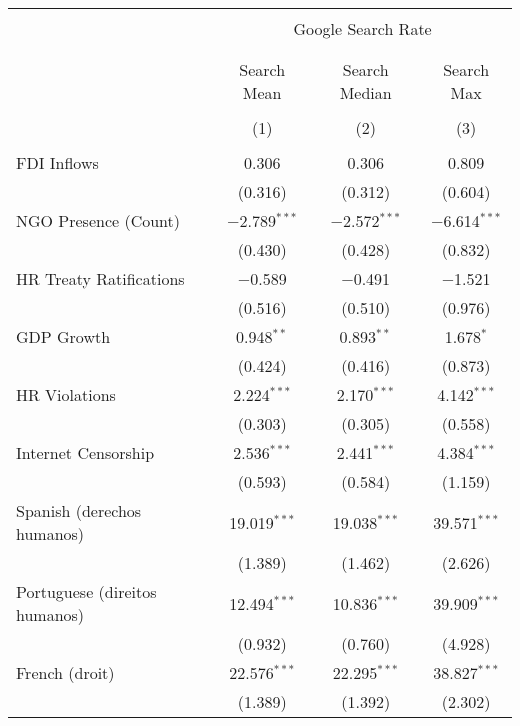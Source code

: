 
\begin{table}[!htbp] \centering 
  \caption{} 
  \label{} 
\begin{tabular}{@{\extracolsep{5pt}}lccc} 
\\[-1.8ex]\hline 
\hline \\[-1.8ex] 
 & \multicolumn{3}{c}{Google Search Rate} \\ 
\cline{2-4} 
\\[-1.8ex] & \multicolumn{3}{c}{ } \\ 
 & Search Mean & Search Median & Search Max \\ 
\\[-1.8ex] & (1) & (2) & (3)\\ 
\hline \\[-1.8ex] 
 FDI Inflows & 0.306 & 0.306 & 0.809 \\ 
  & (0.316) & (0.312) & (0.604) \\ 
  NGO Presence (Count) & $-$2.789$^{***}$ & $-$2.572$^{***}$ & $-$6.614$^{***}$ \\ 
  & (0.430) & (0.428) & (0.832) \\ 
  HR Treaty Ratifications & $-$0.589 & $-$0.491 & $-$1.521 \\ 
  & (0.516) & (0.510) & (0.976) \\ 
  GDP Growth & 0.948$^{**}$ & 0.893$^{**}$ & 1.678$^{*}$ \\ 
  & (0.424) & (0.416) & (0.873) \\ 
  HR Violations & 2.224$^{***}$ & 2.170$^{***}$ & 4.142$^{***}$ \\ 
  & (0.303) & (0.305) & (0.558) \\ 
  Internet Censorship & 2.536$^{***}$ & 2.441$^{***}$ & 4.384$^{***}$ \\ 
  & (0.593) & (0.584) & (1.159) \\ 
  Spanish (derechos humanos) & 19.019$^{***}$ & 19.038$^{***}$ & 39.571$^{***}$ \\ 
  & (1.389) & (1.462) & (2.626) \\ 
  Portuguese (direitos humanos) & 12.494$^{***}$ & 10.836$^{***}$ & 39.909$^{***}$ \\ 
  & (0.932) & (0.760) & (4.928) \\ 
  French (droit) & 22.576$^{***}$ & 22.295$^{***}$ & 38.827$^{***}$ \\ 
  & (1.389) & (1.392) & (2.302) \\ 

\end{tabular}
\end{table}

